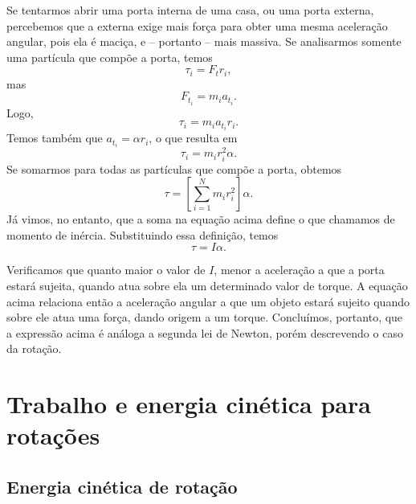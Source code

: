Se tentarmos abrir uma porta interna de uma casa, ou uma porta externa, percebemos que a externa exige mais força para obter uma mesma aceleração angular, pois ela é maciça, e -- portanto -- mais massiva. Se analisarmos somente uma partícula que compõe a porta, temos
\begin{equation}
	\tau_i = F_t r_i,
\end{equation}
%
mas
\begin{equation}
	F_{t_i} = m_i a_{t_i}.
\end{equation}
%
Logo,
\begin{equation}
	\tau_i = m_i a_{t_i} r_i.
\end{equation}
%
Temos também que $a_{t_i} = \alpha r_i$, o que resulta em
\begin{equation}
	\tau_i = m_ir_i^2\alpha.
\end{equation}
%
Se somarmos para todas as partículas que compõe a porta, obtemos
\begin{equation}\label{Eq:DefMomInercia}
	\tau = \left[\sum_{i = 1}^N m_i r_i^2\right] \alpha.
\end{equation}
%
Já vimos, no entanto, que a soma na equação acima define o que chamamos de momento de inércia. Substituindo essa definição, temos
\begin{equation}
	\tau = I\alpha.
\end{equation}

Verificamos que quanto maior o valor de $I$, menor a aceleração a que a porta estará sujeita, quando atua sobre ela um determinado valor de torque. A equação acima relaciona então a aceleração angular a que um objeto estará sujeito quando sobre ele atua uma força, dando origem a um torque. Concluímos, portanto, que a expressão acima é análoga a segunda lei de Newton, porém descrevendo o caso da rotação.

\section{Trabalho e energia cinética para rotações}

\subsection{Energia cinética de rotação}

